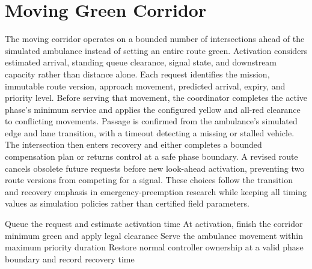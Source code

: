 \section{Moving Green Corridor}

The moving corridor operates on a bounded number of intersections ahead of the simulated ambulance instead of setting an entire route green. Activation considers estimated arrival, standing queue clearance, signal state, and downstream capacity rather than distance alone. Each request identifies the mission, immutable route version, approach movement, predicted arrival, expiry, and priority level. Before serving that movement, the coordinator completes the active phase's minimum service and applies the configured yellow and all-red clearance to conflicting movements. Passage is confirmed from the ambulance's simulated edge and lane transition, with a timeout detecting a missing or stalled vehicle. The intersection then enters recovery and either completes a bounded compensation plan or returns control at a safe phase boundary. A revised route cancels obsolete future requests before new look-ahead activation, preventing two route versions from competing for a signal. These choices follow the transition and recovery emphasis in emergency-preemption research \cite{qin2012preemption} while keeping all timing values as simulation policies rather than certified field parameters.

\begin{algorithm}[H]
\caption{Corridor lifecycle at one intersection}
\label{alg:corridor}
Queue the request and estimate activation time\;
At activation, finish the corridor minimum green and apply legal clearance\;
Serve the ambulance movement within maximum priority duration\;
Restore normal controller ownership at a valid phase boundary and record recovery time\;
\end{algorithm}

